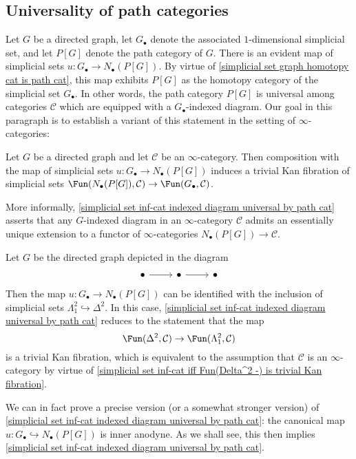 \subsection{Universality of path categories}
Let $G$ be a directed graph, let $G_\bullet$ denote the associated $1$-dimensional simplicial set, and let $P[G]$ denote the path category of $G$. There is an evident map of simplicial sets $u:G_\bullet\to N_\bullet(P[G])$. By virtue of \cref{simplicial set graph homotopy cat is path cat}, this map exhibits $P[G]$ as the homotopy category of the simplicial set $G_\bullet$. In other words, the path category $P[G]$ is universal among categories $\mathcal{C}$ which are equipped with a $G_\bullet$-indexed diagram. Our goal in this paragraph is to establish a variant of this statement in the setting of $\infty$-categories:
\begin{theorem}\label{simplicial set inf-cat indexed diagram universal by path cat}
Let $G$ be a directed graph and let $\mathcal{C}$ be an $\infty$-category. Then composition with the map of simplicial sets $u:G_\bullet\to N_\bullet(P[G])$ induces a trivial Kan fibration of simplicial sets $\Fun(N_\bullet(P[G]),\mathcal{C})\to\Fun(G_\bullet,\mathcal{C})$.
\end{theorem}
More informally, \cref{simplicial set inf-cat indexed diagram universal by path cat} asserts that any $G$-indexed diagram in an $\infty$-category $\mathcal{C}$ admits an essentially unique extension to a functor of $\infty$-categories $N_\bullet(P[G])\to\mathcal{C}$.
\begin{example}
Let $G$ be the directed graph depicted in the diagram
\[\begin{tikzcd}
\bullet\ar[r]&\bullet\ar[r]&\bullet
\end{tikzcd}\]
Then the map $u:G_\bullet\to N_\bullet(P[G])$ can be identified with the inclusion of simplicial sets $\Lambda^2_1\hookrightarrow\Delta^2$. In this case, \cref{simplicial set inf-cat indexed diagram universal by path cat} reduces to the statement that the map
\[\Fun(\Delta^2,\mathcal{C})\to\Fun(\Lambda^2_1,\mathcal{C})\]
is a trivial Kan fibration, which is equivalent to the assumption that $\mathcal{C}$ is an $\infty$-category by virtue of \cref{simplicial set inf-cat iff Fun(Delta^2 -) is trivial Kan fibration}.
\end{example}
We can in fact prove a precise version (or a somewhat stronger version) of \cref{simplicial set inf-cat indexed diagram universal by path cat}: the canonical map $u:G_\bullet\hookrightarrow N_\bullet(P[G])$ is inner anodyne. As we shall see, this then implies \cref{simplicial set inf-cat indexed diagram universal by path cat}.
